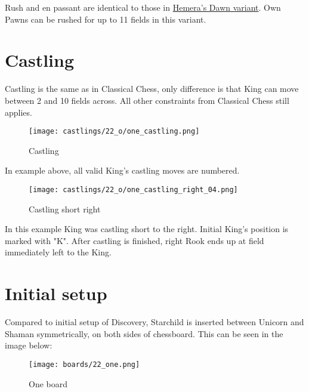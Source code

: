 Rush and en passant are identical to those in \hyperref[fig:14_hemera_s_dawn_en_passant]{Hemera's Dawn variant}.
Own Pawns can be rushed for up to 11 fields in this variant.

\clearpage %

\section*{Castling}

Castling is the same as in Classical Chess, only difference is that King can move between 2 and 10 fields across.
All other constraints from Classical Chess still applies.

\noindent
\begin{figure}[!h]
\texttt{[image: castlings/22\_o/one\_castling.png]}
\caption{Castling}
\label{fig:one_castling}
\end{figure}

In example above, all valid King's castling moves are numbered.

\noindent
\begin{figure}[!h]
\texttt{[image: castlings/22\_o/one\_castling\_right\_04.png]}
\caption{Castling short right}
\label{fig:one_castling_right_04}
\end{figure}

In this example King was castling short to the right. Initial King's position is marked with "K".
After castling is finished, right Rook ends up at field immediately left to the King.

\clearpage %

\section*{Initial setup}

Compared to initial setup of Discovery, Starchild is inserted between Unicorn and Shaman
symmetrically, on both sides of chessboard. This can be seen in the image below:

\noindent
\begin{figure}[h]
\texttt{[image: boards/22\_one.png]}
\caption{One board}
\label{fig:22_one}
\end{figure}

\clearpage %
